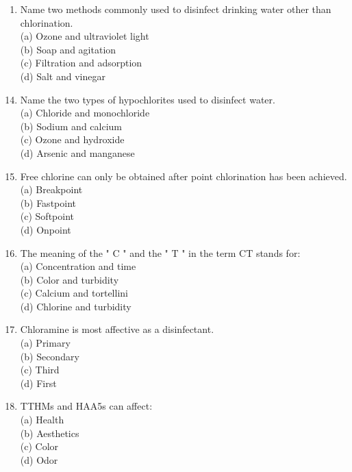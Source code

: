 \documentclass[10pt]{article}
\begin{document}
\begin{enumerate}
\begin{enumerate}
\begin{enumerate}
(a) Coliform bacteria test

(b) Color test

(c) Turbidity test

(d) Particle test 

\item Name two methods commonly used to disinfect drinking water other than chlorination.\\
(a) Ozone and ultraviolet light\\
(b) Soap and agitation\\
(c) Filtration and adsorption\\
(d) Salt and vinegar
\end{enumerate}
\begin{enumerate}
  \setcounter{enumi}{13}
  \item Name the two types of hypochlorites used to disinfect water.\\
(a) Chloride and monochloride\\
(b) Sodium and calcium\\
(c) Ozone and hydroxide\\
(d) Arsenic and manganese\\

  \item Free chlorine can only be obtained after point chlorination has been achieved.\\
(a) Breakpoint\\
(b) Fastpoint\\
(c) Softpoint\\
(d) Onpoint\\

  \item The meaning of the " $\mathrm{C}$ " and the " $\mathrm{T}$ " in the term $\mathrm{CT}$ stands for:\\
(a) Concentration and time\\
(b) Color and turbidity\\
(c) Calcium and tortellini\\
(d) Chlorine and turbidity\\

  \item Chloramine is most affective as a disinfectant.\\
(a) Primary\\
(b) Secondary\\
(c) Third\\
(d) First\\

  \item TTHMs and HAA5s can affect:\\
(a) Health\\
(b) Aesthetics\\
(c) Color\\
(d) Odor\\


\end{enumerate}
\end{enumerate}
\end{enumerate}
\end{document}
